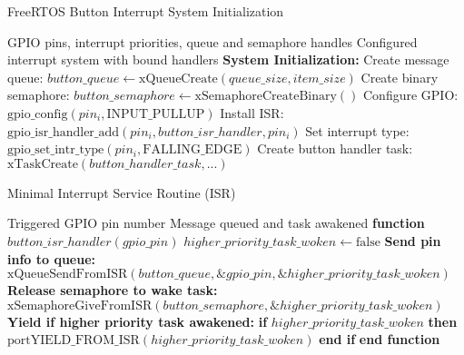 \documentclass{article}
\begin{document}
\begin{algorithm}
\caption{FreeRTOS Button Interrupt System Initialization}
\label{alg:interrupt_init}
\begin{algorithmic}[1]
\REQUIRE GPIO pins, interrupt priorities, queue and semaphore handles
\ENSURE Configured interrupt system with bound handlers
\STATE \textbf{System Initialization:}
\STATE Create message queue: $button\_queue \leftarrow \text{xQueueCreate}(queue\_size, item\_size)$
\STATE Create binary semaphore: $button\_semaphore \leftarrow \text{xSemaphoreCreateBinary}()$
\STATE
{}
    \STATE Configure GPIO: $\text{gpio\_config}(pin_i, \text{INPUT\_PULLUP})$
    \STATE Install ISR: $\text{gpio\_isr\_handler\_add}(pin_i, button\_isr\_handler, pin_i)$
    \STATE Set interrupt type: $\text{gpio\_set\_intr\_type}(pin_i, \text{FALLING\_EDGE})$
\ENDFOR
\STATE
\STATE Create button handler task: $\text{xTaskCreate}(button\_handler\_task, ...)$
\end{algorithmic}
\end{algorithm}

\begin{algorithm}
\caption{Minimal Interrupt Service Routine (ISR)}
\label{alg:minimal_isr}
\begin{algorithmic}[1]
\REQUIRE Triggered GPIO pin number
\ENSURE Message queued and task awakened
\STATE \textbf{function} $button\_isr\_handler(gpio\_pin)$
\STATE \quad $higher\_priority\_task\_woken \leftarrow \text{false}$
\STATE \quad \textbf{Send pin info to queue:}
\STATE \quad $\text{xQueueSendFromISR}(button\_queue, \&gpio\_pin, \&higher\_priority\_task\_woken)$
\STATE \quad \textbf{Release semaphore to wake task:}
\STATE \quad $\text{xSemaphoreGiveFromISR}(button\_semaphore, \&higher\_priority\_task\_woken)$
\STATE \quad \textbf{Yield if higher priority task awakened:}
\STATE \quad \textbf{if} $higher\_priority\_task\_woken$ \textbf{then}
\STATE \quad \quad $\text{portYIELD\_FROM\_ISR}(higher\_priority\_task\_woken)$
\STATE \quad \textbf{end if}
\STATE \textbf{end function}
\end{algorithmic}
\end{algorithm}
\end{document}
